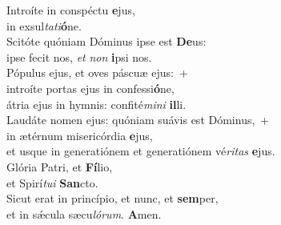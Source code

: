 \evenverse Introíte in conspéctu \textbf{e}jus,~\*\\
\evenverse in exsul\textit{ta}\textit{ti}\textbf{ó}ne.\\
\oddverse Scitóte quóniam Dóminus ipse est \textbf{De}us:~\*\\
\oddverse ipse fecit nos, \textit{et} \textit{non} \textbf{i}psi nos.\\
\evenverse Pópulus ejus, et oves páscuæ ejus:~+\\
\evenverse  introíte portas ejus in confessi\textbf{ó}ne,~\*\\
\evenverse átria ejus in hymnis: confité\textit{mi}\textit{ni} \textbf{il}li.\\
\oddverse Laudáte nomen ejus: quóniam suávis est Dóminus,~+\\
\oddverse  in ætérnum misericórdia \textbf{e}jus,~\*\\
\oddverse et usque in generatiónem et generatiónem vé\textit{ri}\textit{tas} \textbf{e}jus.\\
\evenverse Glória Patri, et \textbf{Fí}lio,~\*\\
\evenverse et Spirí\textit{tu}\textit{i} \textbf{San}cto.\\
\oddverse Sicut erat in princípio, et nunc, et \textbf{sem}per,~\*\\
\oddverse et in sǽcula sæcu\textit{ló}\textit{rum}. \textbf{A}men.\\
